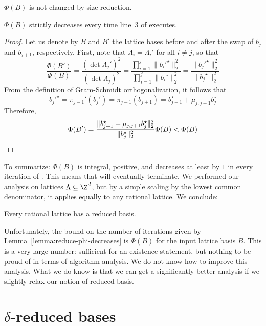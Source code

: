 \begin{lemma}
  $\Phi(B)$ is not changed by size reduction.
\end{lemma}

\begin{lemma}
  \label{lemma:reduce-phi-decreases}
  $\Phi(B)$ strictly decreases every time line~3 of  executes.
\end{lemma}
\begin{proof}
  Let us denote by $B$ and $B'$ the lattice bases before and after the swap of $b_j$ and $b_{j+1}$,
  respectively.
  First, note that $\Lambda_i = \Lambda_i'$ for all $i \neq j$, so that
  \[
    \frac{\Phi(B')}{\Phi(B)} = \frac{(\det\Lambda_j')^2}{(\det\Lambda_j)^2}
      = \frac{\prod_{i=1}^j \|{b_i'}^\star\|_2^2}{\prod_{i=1}^j \|{b_i}^\star\|_2^2}
      = \frac{\|{b_j'}^\star\|_2^2}{\|{b_j}^\star\|_2^2}
  \]
  From the definition of Gram-Schmidt orthogonalization,
  it follows that
  \[ {b_j'}^\star = \pi_{j-1}'(b_j') = \pi_{j-1}(b_{j+1}) = b_{j+1}^\star + \mu_{j,j+1} b_j^\star \]
  Therefore,
  \[
    \Phi(B') = \frac{\|b_{j+1}^\star + \mu_{j,j+1} b_j^\star\|_2^2}{\|b_j^\star\|_2^2} \Phi(B) < \Phi(B) \qedhere
  \]
\end{proof}

To summarize: $\Phi(B)$ is integral, positive,
and decreases at least by $1$ in every iteration of .
This means that  will eventually terminate.
We performed our analysis on lattices $\Lambda \subseteq \Z^d$,
but by a simple scaling by the lowest common denominator,
it applies equally to any rational lattice. We conclude:

\begin{theorem}
  Every rational lattice has a reduced basis.
\end{theorem}

Unfortunately, the bound on the number of iterations given by Lemma~\ref{lemma:reduce-phi-decreases}
is $\Phi(B)$ for the input lattice basis $B$.
This is a very large number: sufficient for an existence statement,
but nothing to be proud of in terms of algorithm analysis.
We do not know how to improve this analysis.
What we do know is that we can get a significantly better analysis if we slightly relax our notion of reduced basis.


\section{\texorpdfstring{$\delta$}{delta}-reduced bases}

